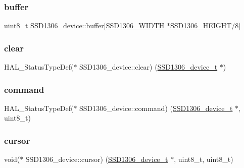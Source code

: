 \subsubsection{\texorpdfstring{buffer}{buffer}}
{\footnotesize\ttfamily uint8\+\_\+t S\+S\+D1306\+\_\+device\+::buffer\mbox{[}\hyperlink{ssd1306_8h_ae5a2aa8865dd03537b97fd1c9037371b}{S\+S\+D1306\+\_\+\+W\+I\+D\+TH} $\ast$\hyperlink{ssd1306_8h_a4e9409448a0df95c1686670e09b457b7}{S\+S\+D1306\+\_\+\+H\+E\+I\+G\+HT}/8\mbox{]}}

\mbox{\label{structSSD1306__device_aa52b8e4126ce8b86afca1428e410340a}} 
\subsubsection{\texorpdfstring{clear}{clear}}
{\footnotesize\ttfamily H\+A\+L\+\_\+\+Status\+Type\+Def($\ast$ S\+S\+D1306\+\_\+device\+::clear) (\hyperlink{datatypes_8h_afa3700e77990b75b3fcc954070aa90fe}{S\+S\+D1306\+\_\+device\+\_\+t} $\ast$)}

\mbox{\label{structSSD1306__device_a00e78b709181f9a47c7be081e90eda4f}} 
\subsubsection{\texorpdfstring{command}{command}}
{\footnotesize\ttfamily H\+A\+L\+\_\+\+Status\+Type\+Def($\ast$ S\+S\+D1306\+\_\+device\+::command) (\hyperlink{datatypes_8h_afa3700e77990b75b3fcc954070aa90fe}{S\+S\+D1306\+\_\+device\+\_\+t} $\ast$, uint8\+\_\+t)}

\mbox{\label{structSSD1306__device_a66f7cc22a12c45ede50843a63c0754c6}} 
\subsubsection{\texorpdfstring{cursor}{cursor}}
{\footnotesize\ttfamily void($\ast$ S\+S\+D1306\+\_\+device\+::cursor) (\hyperlink{datatypes_8h_afa3700e77990b75b3fcc954070aa90fe}{S\+S\+D1306\+\_\+device\+\_\+t} $\ast$, uint8\+\_\+t, uint8\+\_\+t)}

